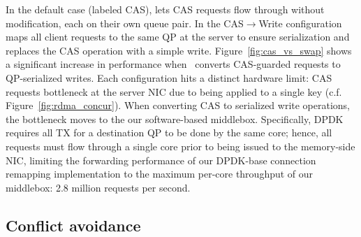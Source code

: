 In the default case (labeled CAS), {\sword} lets CAS requests flow
through without modification, each on their own queue pair.  In the
CAS$\rightarrow$Write configuration {\sword} maps all client requests
to the same QP at the server to ensure serialization and replaces the
CAS operation with a simple write.
%
%
Figure~\ref{fig:cas_vs_swap} shows a significant increase in
performance when \sword\ converts CAS-guarded requests to
QP-serialized writes.  Each configuration hits a distinct hardware
limit: CAS requests bottleneck at the server NIC due to being applied
to a single key (c.f. Figure~\ref{fig:rdma_concur}).  When converting
CAS to serialized write operations, the bottleneck moves to the our
software-based middlebox.
Specifically, DPDK requires all TX for a destination QP to be done by
the same core; hence,
all requests must flow through a single core prior to being issued to
the memory-side NIC, limiting the forwarding performance of our
DPDK-base connection remapping implementation to the maximum per-core
throughput of our middlebox: 2.8 million requests per second.



\subsection{Conflict avoidance}

